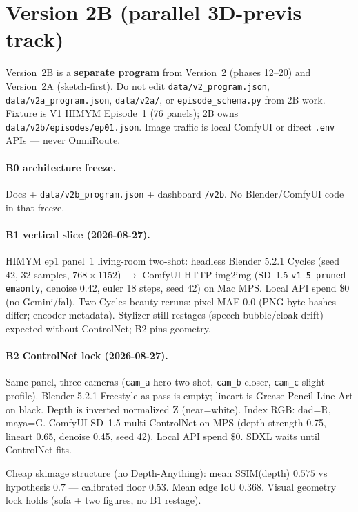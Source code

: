 \documentclass[10pt,twocolumn,letterpaper]{article}
\begin{document}
\section{Version 2B (parallel 3D-previs track)}
\label{sec:v2b}
Version~2B is a \textbf{separate program} from Version~2 (phases 12--20) and Version~2A (sketch-first).
Do not edit \texttt{data/v2\_program.json}, \texttt{data/v2a\_program.json}, \texttt{data/v2a/}, or \texttt{episode\_schema.py} from 2B work.
Fixture is V1 HIMYM Episode~1 (76 panels); 2B owns \texttt{data/v2b/episodes/ep01.json}. Image traffic is local ComfyUI or direct \texttt{.env} APIs --- never OmniRoute.

\paragraph{B0 architecture freeze.}
Docs + \texttt{data/v2b\_program.json} + dashboard \texttt{/v2b}. No Blender/ComfyUI code in that freeze.

\paragraph{B1 vertical slice (2026-08-27).}
HIMYM ep1 panel~1 living-room two-shot: headless Blender 5.2.1 Cycles (seed 42, 32 samples, $768\times1152$) $\rightarrow$ ComfyUI HTTP img2img (SD~1.5 \texttt{v1-5-pruned-emaonly}, denoise 0.42, euler 18 steps, seed 42) on Mac MPS.
Local API spend \$0 (no Gemini/fal).
Two Cycles beauty reruns: pixel MAE $0.0$ (PNG byte hashes differ; encoder metadata).
Stylizer still restages (speech-bubble/cloak drift) --- expected without ControlNet; B2 pins geometry.

\paragraph{B2 ControlNet lock (2026-08-27).}
Same panel, three cameras (\texttt{cam\_a} hero two-shot, \texttt{cam\_b} closer, \texttt{cam\_c} slight profile).
Blender 5.2.1 Freestyle-as-pass is empty; lineart is Grease Pencil Line Art on black. Depth is inverted normalized Z (near=white). Index RGB: dad=R, maya=G.
ComfyUI SD~1.5 multi-ControlNet on MPS (depth strength 0.75, lineart 0.65, denoise 0.45, seed 42). Local API spend \$0. SDXL waits until ControlNet fits.

Cheap skimage structure (no Depth-Anything): mean SSIM(depth) $0.575$ vs hypothesis $0.7$ --- calibrated floor $0.53$. Mean edge IoU $0.368$. Visual geometry lock holds (sofa + two figures, no B1 restage).
\end{document}
